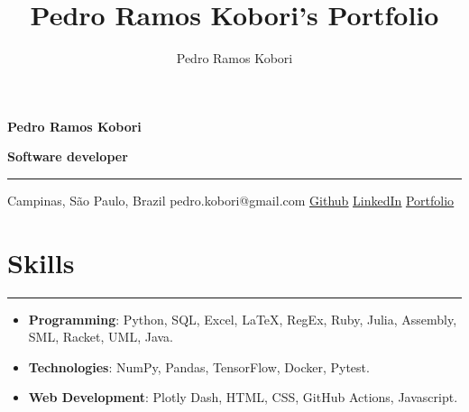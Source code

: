 \documentclass[a4paper,10pt]{article}
\title{Pedro Ramos Kobori's Portfolio}
\newcommand{\ulink}[2]{\href{#1}{\underline{#2}}}
\begin{document}
\date{}
\author{Pedro Ramos Kobori}

\noindent
\begin{minipage}[t]{0.5\textwidth}
  \begin{flushleft}
    \textbf{\Large Pedro Ramos Kobori}
  \end{flushleft}
\end{minipage}
\begin{minipage}[t]{0.5\textwidth}
  \begin{flushright}
    \textbf{\Large Software developer}
  \end{flushright}
\end{minipage}

\hrule

\vspace{2mm}
\noindent
{
  \centering
  Campinas, São Paulo, Brazil \textbar{}
  pedro.kobori@gmail.com \textbar{}
  \ulink{https://github.com/rokobo}{Github} \textbar{}
  \ulink{https://www.linkedin.com/in/pedrokobori/}{LinkedIn} \textbar{}
  \ulink{https://rokobo.github.io}{Portfolio}
  \par
}

\section*{Skills}
\hrule
\vspace{2mm}
\begin{itemize}[itemsep=0pt]
  \item \textbf{Programming}: Python, SQL, Excel, LaTeX, RegEx, Ruby, Julia, Assembly, SML, Racket, UML, Java.
  \item \textbf{Technologies}: NumPy, Pandas, TensorFlow, Docker, Pytest.
  \item \textbf{Web Development}: Plotly Dash, HTML, CSS, GitHub Actions, Javascript.
\end{itemize}
\end{document}
